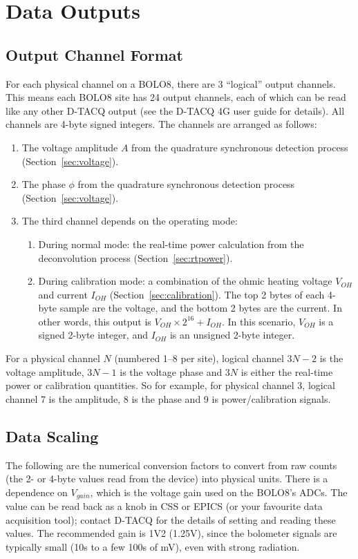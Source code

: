 \documentclass[12pt,a4paper]{article}
\begin{document}
\section{Data Outputs}%
\label{sec:outputs}
\subsection{Output Channel Format}%
\label{sec:channels}
For each physical channel on a BOLO8, there are 3 ``logical'' output channels. This means each BOLO8 site has 24 output channels, each of which can be read
like any other D-TACQ output (see the D-TACQ 4G user guide for details). All channels are 4-byte signed integers. The channels are arranged as follows:
\begin{enumerate}
\item{The voltage amplitude $A$ from the quadrature synchronous detection process (Section~\ref{sec:voltage}).}
\item{The phase $\phi$ from the quadrature synchronous detection process (Section~\ref{sec:voltage}).}
\item{The third channel depends on the operating mode:}
  \begin{enumerate}
  \item{During normal mode: the real-time power calculation from the deconvolution process (Section~\ref{sec:rtpower}).}
  \item{During calibration mode: a combination of the ohmic heating voltage $V_{OH}$ and current $I_{OH}$ (Section~\ref{sec:calibration}). The top 2 bytes of
      each 4-byte sample are the voltage, and the bottom 2 bytes are the current. In other words, this output is $V_{OH} \times 2^{16} + I_{OH}$. In this
      scenario, $V_{OH}$ is a signed 2-byte integer, and $I_{OH}$ is an unsigned 2-byte integer.}
  \end{enumerate}
\end{enumerate}

For a physical channel $N$ (numbered 1--8 per site), logical channel $3N-2$ is the voltage amplitude, $3N-1$ is the voltage phase and $3N$ is either the
real-time power or calibration quantities. So for example, for physical channel 3, logical channel 7 is the amplitude, 8 is the phase and 9 is
power/calibration signals.

\subsection{Data Scaling}%
\label{sec:scaling}
The following are the numerical conversion factors to convert from raw counts (the 2- or 4-byte values read from the device) into physical units. There is
a dependence on $V_{gain}$, which is the voltage gain used on the BOLO8's ADCs. The value can be read back as a knob in CSS or EPICS (or your favourite data
acquisition tool); contact D-TACQ for the details of setting and reading these values. The recommended gain is 1V2 (1.25V), since the bolometer signals are
typically small (10s to a few 100s of mV), even with strong radiation.
\end{document}
